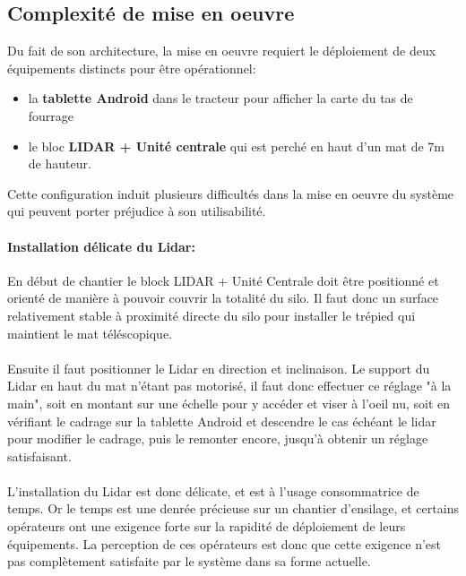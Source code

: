 \documentclass[12pt,a4paper]{report}
\begin{document}
\subsection{Complexité de mise en oeuvre}

Du fait de son architecture, la mise en oeuvre requiert le déploiement de deux équipements distincts pour être opérationnel:

\begin{itemize}
	\item la \textbf{tablette Android} dans le tracteur pour afficher la carte du tas de fourrage
	\item le bloc \textbf{LIDAR + Unité centrale} qui est perché en haut d'un mat de 7m de hauteur.
\end{itemize}

Cette configuration induit plusieurs difficultés dans la mise en oeuvre du système qui peuvent porter préjudice à son utilisabilité.

\paragraph{Installation délicate du Lidar:} En début de chantier le block LIDAR + Unité Centrale doit être positionné et orienté de manière à pouvoir couvrir la totalité du silo. Il faut donc un surface relativement stable à proximité directe du silo pour installer le trépied qui maintient le mat téléscopique.

\paragraph{} Ensuite il faut positionner le Lidar en direction et inclinaison. Le support du Lidar en haut du mat n'étant pas motorisé, il faut donc effectuer ce réglage "à la main", soit en montant sur une échelle pour y accéder et viser à l'oeil nu, soit en vérifiant le cadrage sur la tablette Android et descendre le cas échéant le lidar pour modifier le cadrage, puis le remonter encore, jusqu'à obtenir un réglage satisfaisant.

\paragraph{} L'installation du Lidar est donc délicate, et est à l'usage consommatrice de temps. Or le temps est une denrée précieuse sur un chantier d'ensilage, et certains opérateurs ont une exigence forte sur la rapidité de déploiement de leurs équipements. La perception de ces opérateurs est donc que cette exigence n'est pas complètement satisfaite par le système dans sa forme actuelle.
\end{document}
